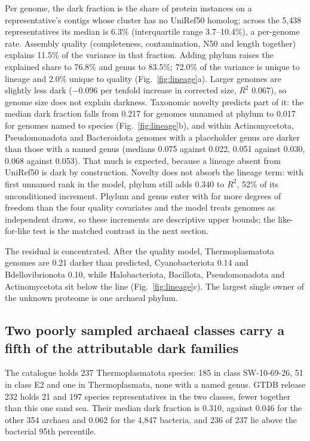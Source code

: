 \documentclass[11pt]{article}
\begin{document}
Per genome, the dark fraction is the share of protein instances on a representative's contigs whose
cluster has no UniRef50 homolog; across the 5{,}438 representatives its median is 6.3\%
(interquartile range 3.7--10.4\%), a per-genome rate. Assembly quality (completeness, contamination, N50 and length together) explains 11.5\% of the
variance in that fraction. Adding phylum raises the explained share to 76.8\% and genus to 83.5\%;
72.0\% of the variance is unique to lineage and 2.0\% unique to quality (Fig.~\ref{fig:lineage}a).
Larger genomes are slightly less dark ($-0.096$ per tenfold increase in corrected size, $R^2$ 0.067),
so genome size does not explain darkness. Taxonomic novelty predicts part of it: the median dark
fraction falls from 0.217 for genomes unnamed at phylum to 0.017 for genomes named to species
(Fig.~\ref{fig:lineage}b), and within Actinomycetota, Pseudomonadota and Bacteroidota genomes with a
placeholder genus are darker than those with a named genus (medians 0.075 against 0.022, 0.051
against 0.030, 0.068 against 0.053). That much is expected, because a lineage absent from UniRef50
is dark by construction. Novelty does not absorb the lineage term: with first unnamed rank in the
model, phylum still adds 0.340 to $R^2$, 52\% of its unconditioned increment. Phylum and genus enter
with far more degrees of freedom than the four quality covariates and the model treats genomes as
independent draws, so these increments are descriptive upper bounds; the like-for-like test is the
matched contrast in the next section.

The residual is concentrated. After the quality model, Thermoplasmatota genomes are 0.21 darker than
predicted, Cyanobacteriota 0.14 and Bdellovibrionota 0.10, while Halobacteriota, Bacillota,
Pseudomonadota and Actinomycetota sit below the line (Fig.~\ref{fig:lineage}c). The largest single
owner of the unknown proteome is one archaeal phylum.

\subsection*{Two poorly sampled archaeal classes carry a fifth of the attributable dark families}

The catalogue holds 237 Thermoplasmatota species: 185 in class SW-10-69-26, 51 in class E2 and one
in Thermoplasmata, none with a named genus. GTDB release 232 holds 21 and 197 species
representatives in the two classes, fewer together than this one sand sea. Their median dark
fraction is 0.310, against 0.046 for the other 354 archaea and 0.062 for the 4{,}847 bacteria, and
236 of 237 lie above the bacterial 95th percentile.
\end{document}
